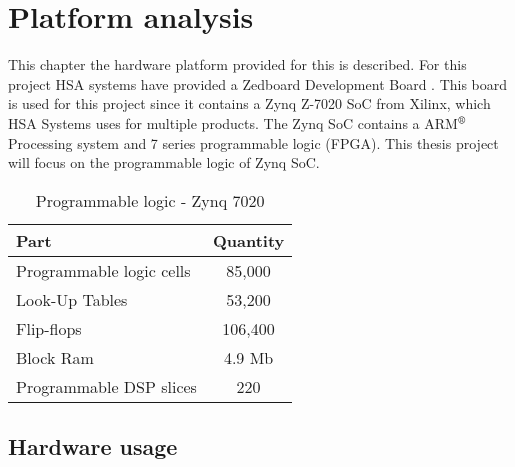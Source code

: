 \chapter{Platform analysis} \label{ch:plaanalysis}
This chapter the hardware platform provided for this is described. For this project HSA systems have provided a Zedboard Development Board \cite{Zedboard2014}. This board is used for this project since it contains a Zynq Z-7020 SoC from Xilinx, which HSA Systems uses for multiple products. The Zynq SoC contains a ARM$^\text{\textregistered}$ Processing system and 7 series programmable logic (FPGA). This thesis project will focus on the programmable logic of Zynq SoC. 

\begin{table}[ht!]
  \centering
  \begin{tabular}{l c}
  \toprule
  \textbf{Part} & \textbf{Quantity} \\
  \toprule
  Programmable logic cells &  85,000\\
  \midrule
  Look-Up Tables & 53,200\\
  \midrule
  Flip-flops & 106,400\\
  \midrule
  Block Ram  & 4.9 Mb\\
  \midrule
  Programmable DSP slices & 220 \\
  \bottomrule
  \end{tabular}
  \caption{Programmable logic - Zynq 7020 \cite{zynq20137000}}
  \label{tb:z7020-parts}
\end{table}

\section{Hardware usage}

